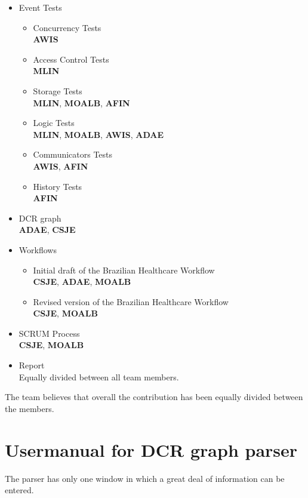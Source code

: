 \begin{itemize}
	\item Event Tests
	\begin{itemize}
		\item Concurrency Tests\\
		\textbf{AWIS}
		\item Access Control Tests\\
		\textbf{MLIN}
		\item Storage Tests\\
		\textbf{MLIN}, \textbf{MOALB}, \textbf{AFIN}
		\item Logic Tests\\
		\textbf{MLIN}, \textbf{MOALB}, \textbf{AWIS}, \textbf{ADAE}
		\item Communicators Tests\\
		\textbf{AWIS}, \textbf{AFIN}
		\item History Tests\\
		\textbf{AFIN}
	\end{itemize}
	\item DCR graph\\
	\textbf{ADAE}, \textbf{CSJE}
	\item Workflows
	\begin{itemize}
		\item Initial draft of the Brazilian Healthcare Workflow\\
		\textbf{CSJE}, \textbf{ADAE}, \textbf{MOALB}
		\item Revised version of the Brazilian Healthcare Workflow\\
		\textbf{CSJE}, \textbf{MOALB}
	\end{itemize}
	\item SCRUM Process\\
	\textbf{CSJE}, \textbf{MOALB}
	\item Report\\
	Equally divided between all team members.
\end{itemize}

The team believes that overall the contribution has been equally divided between the members.



\section{Usermanual for DCR graph parser \label{sec:UsermanualForDcrGraphParser}}
The parser has only one window in which a great deal of information can be entered.\\

